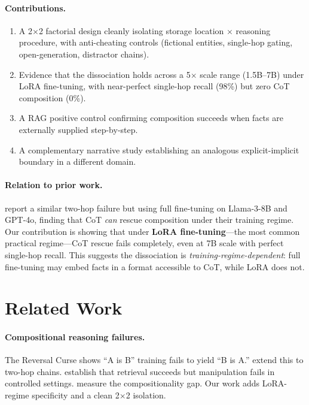 \documentclass[11pt]{article}
\begin{document}
\paragraph{Contributions.}
\begin{enumerate}
\item A 2$\times$2 factorial design cleanly isolating storage location $\times$ reasoning procedure, with anti-cheating controls (fictional entities, single-hop gating, open-generation, distractor chains).
\item Evidence that the dissociation holds across a 5$\times$ scale range (1.5B--7B) under LoRA fine-tuning, with near-perfect single-hop recall (98\%) but zero CoT composition (0\%).
\item A RAG positive control confirming composition succeeds when facts are externally supplied step-by-step.
\item A complementary narrative study establishing an analogous explicit-implicit boundary in a different domain.
\end{enumerate}

\paragraph{Relation to prior work.} \citet{balesni2024twohop} report a similar two-hop failure but using full fine-tuning on Llama-3-8B and GPT-4o, finding that CoT \emph{can} rescue composition under their training regime. Our contribution is showing that under \textbf{LoRA fine-tuning}---the most common practical regime---CoT rescue fails completely, even at 7B scale with perfect single-hop recall. This suggests the dissociation is \emph{training-regime-dependent}: full fine-tuning may embed facts in a format accessible to CoT, while LoRA does not.

\section{Related Work}

\paragraph{Compositional reasoning failures.} The Reversal Curse \cite{berglund2023reversal} shows ``A is B'' training fails to yield ``B is A.'' \citet{balesni2024twohop} extend this to two-hop chains. \citet{allenzhu2024physics} establish that retrieval succeeds but manipulation fails in controlled settings. \citet{press2023compositionality} measure the compositionality gap. Our work adds LoRA-regime specificity and a clean 2$\times$2 isolation.
\end{document}
